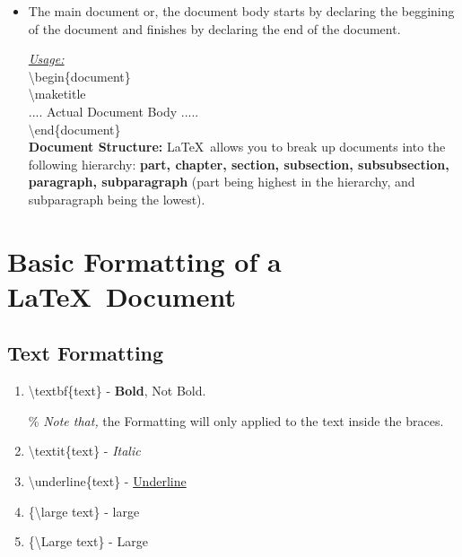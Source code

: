 \documentclass[12pt, twocolumn]{article}
\begin{document}
\begin{itemize}
 \textbackslash usepackage[opt,opt]\{package name\} \\
 
 All the available \LaTeX\ packages and their documentation can be found here at \url{https://ctan.org/pkg/}.
 
 You can find topic specific packages and additional help at \url{https://ctan.org/topics/cloud}
 

 \item The main document or, the document body starts by declaring the beggining of the document and finishes by declaring the end of the document.\\
 \pagebreak
 
 \underline{\textit{Usage:}} \\
 
 \textbackslash begin\{document\} \\
 \hspace*{6mm} \textbackslash maketitle  \\
 \hspace*{6mm} .... Actual Document Body ..... \\
 \textbackslash end\{document\} \\
 
 \textbf{{\normalsize Document Structure:}}
 \LaTeX\ allows you to break up documents into the following hierarchy: \textbf{part, chapter, section, subsection, subsubsection, paragraph, subparagraph} (part being highest in the hierarchy, and subparagraph being the lowest).
 
 \end{itemize}
 
 \section{Basic Formatting of a \LaTeX\ Document}
 
 \subsection{Text Formatting}
 \begin{enumerate}
   \item \textbackslash textbf\{text\} - \textbf{Bold}, Not Bold.
   
 \% \emph{Note that,} the Formatting will only applied to the text inside the {} braces.
 \item \textbackslash textit\{text\} - \textit{Italic}
 \item \textbackslash underline\{text\} - \underline{Underline}
 \item \{\textbackslash large text\} - {\large large}
 \item \{\textbackslash Large text\} - {\Large Large}
 \end{enumerate}
\end{document}
